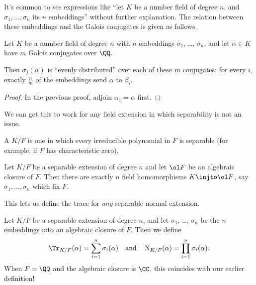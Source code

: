 It's common to see expressions like ``let $K$ be a number field of degree $n$,
and $\sigma_1, \dots, \sigma_n$ its $n$ embeddings'' without further explanation.
The relation between these embeddings and the Galois conjugates is given as follows.
\begin{theorem}
	Let $K$ be a number field of degree $n$ with $n$ embeddings $\sigma_1$, \dots, $\sigma_n$,
	and let $\alpha \in K$ have $m$ Galois conjugates over $\QQ$. 

	Then $\sigma_j(\alpha)$ is ``evenly distributed'' over each of these $m$ conjugates:
	for every $i$, exactly $\frac nm$ of the embeddings send $\alpha$ to $\beta_i$.
\end{theorem}
\begin{proof}
	In the previous proof, adjoin $\alpha_1 = \alpha$ first.
\end{proof}

We can get this to work for any field extension in which separability is not an issue.
\begin{definition}
	A  $K/F$ is one in which every irreducible
	polynomial in $F$ is separable (for example, if $F$ has characteristic zero).
\end{definition}
\begin{theorem}
	Let $K/F$ be a separable extension of degree $n$ and let $\ol F$ be an algebraic closure of $F$.
	Then there are exactly $n$ field homomorphisms $K \injto \ol F$,
	say $\sigma_1, \dots, \sigma_n$ which fix $F$.
\end{theorem}

This lets us define the trace for \emph{any} separable normal extension.
\begin{definition}
Let $K/F$ be a separable extension of degree $n$, and let $\sigma_1$, \dots, $\sigma_n$
be the $n$ embeddings into an algebraic closure of $F$. Then we define
\[
	\Tr_{K/F}(\alpha) = \sum_{i=1}^n \sigma_i(\alpha)
	\quad\text{and}\quad
	\Norm_{K/F}(\alpha) = \prod_{i=1}^n \sigma_i(\alpha).
\]
When $F = \QQ$ and the algebraic closure is $\CC$, this coincides with our earlier definition!
\end{definition}

